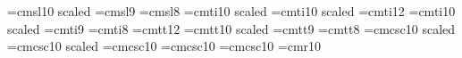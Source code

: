 \font\elvsl=cmsl10 scaled\magstephalf
\font\ninesl=cmsl9
\font\egtsl=cmsl8
%
\font\seventeenit=cmti10 scaled
\font\fourteenit=cmti10 scaled
\font\twelveit=cmti12
\font\elvit=cmti10 scaled \magstephalf
\font\nineit=cmti9
\font\egtit=cmti8
%
\font\twelvett=cmtt12
\font\elvtt=cmtt10 scaled \magstephalf
\font\ninett=cmtt9
\font\egttt=cmtt8
%
 \font\twelvecp=cmcsc10 scaled
 \font\elvcp=cmcsc10 scaled\magstephalf
 \font\tencp=cmcsc10
 \font\ninecp=cmcsc10
 \font\egtcp=cmcsc10
 \newfam\cpfam
%
\font\tenfib=cmr10      %
%
\newcount\f@ntkey            {}
\def\samef@nt{\relax \ifcase\f@ntkey \rm \or\oldstyle \or\or
         \or\it \or\sl \or\bf \or\tt \or\caps \fi }
%
\def\fourteenpoint{\relax
    \textfont0=\fourteenrm          \scriptfont0=\tenrm
    \scriptscriptfont0=\sevenrm
     \def\rm{\fam0 \fourteenrm \f@ntkey=0 }\relax
    \textfont1=\fourteeni           \scriptfont1=\teni
    \scriptscriptfont1=\seveni
     \def\oldstyle{\fam1 \fourteeni\f@ntkey=1 }\relax
    \textfont2=\fourteensy          \scriptfont2=\tensy
    \scriptscriptfont2=\sevensy
    \textfont3=\fourteenex     \scriptfont3=\fourteenex
    \scriptscriptfont3=\fourteenex
    \def\it{\fam\itfam \fourteenit\f@ntkey=4 }\textfont\itfam=\fourteenit
    \def\sl{\fam\slfam \fourteensl\f@ntkey=5 }\textfont\slfam=\fourteensl
    \scriptfont\slfam=\tensl
    \def\bf{\fam\bffam \fourteenbf\f@ntkey=6 }\textfont\bffam=\fourteenbf
    \scriptfont\bffam=\tenbf     \scriptscriptfont\bffam=\sevenbf
    \def\tt{\fam\ttfam \twelvett \f@ntkey=7 }\textfont\ttfam=\twelvett
    \h@big=11.9\p@{} \h@Big=16.1\p@{} \h@bigg=20.3\p@{} \h@Bigg=24.5\p@{}
    \def\caps{\fam\cpfam \twelvecp \f@ntkey=8 }\textfont\cpfam=\twelvecp
    \setbox\strutbox=\hbox{\vrule height 12pt depth 5pt width\z@}
    \samef@nt}
%
\def\twelvepoint{\relax
    \textfont0=\twelverm          \scriptfont0=\ninerm
    \scriptscriptfont0=\sixrm
     \def\rm{\fam0 \twelverm \f@ntkey=0 }\relax
    \textfont1=\twelvei           \scriptfont1=\ninei
    \scriptscriptfont1=\sixi
     \def\oldstyle{\fam1 \twelvei\f@ntkey=1 }\relax
    \textfont2=\twelvesy          \scriptfont2=\ninesy
    \scriptscriptfont2=\sixsy
    \textfont3=\twelveex          \scriptfont3=\twelveex
    \scriptscriptfont3=\twelveex
    \def\it{\fam\itfam \twelveit \f@ntkey=4 }\textfont\itfam=\twelveit
    \def\sl{\fam\slfam \twelvesl \f@ntkey=5 }\textfont\slfam=\twelvesl
    \scriptfont\slfam=\ninesl
    \def\bf{\fam\bffam \twelvebf \f@ntkey=6 }\textfont\bffam=\twelvebf
    \scriptfont\bffam=\ninebf     \scriptscriptfont\bffam=\sixbf
    \def\tt{\fam\ttfam \twelvett \f@ntkey=7 }\textfont\ttfam=\twelvett
    \h@big=10.2\p@{}
    \h@Big=13.8\p@{}
    \h@bigg=17.4\p@{}
    \h@Bigg=21.0\p@{}
    \def\caps{\fam\cpfam \twelvecp \f@ntkey=8 }\textfont\cpfam=\twelvecp
    \setbox\strutbox=\hbox{\vrule height 10pt depth 4pt width\z@}
    \samef@nt}
